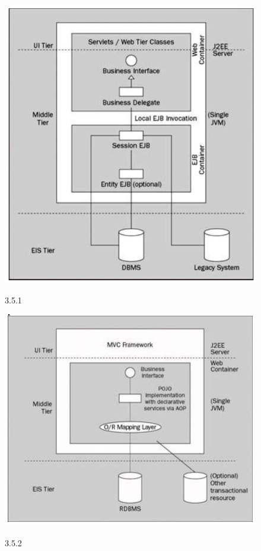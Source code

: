 \documentclass{article}
\begin{document}
				\begin{figure}[!htb]
					\includegraphics[width=.8\textwidth]{img5.png}
					\begin{center}
						\figurename{ 3.5.1}
					\end{center}
				\end{figure}

				\begin{figure}[!htb]
					\includegraphics[width=.8\textwidth]{img6.png}
					\begin{center}
						\figurename{ 3.5.2}
					\end{center}
				\end{figure}		
				
\end{document}
